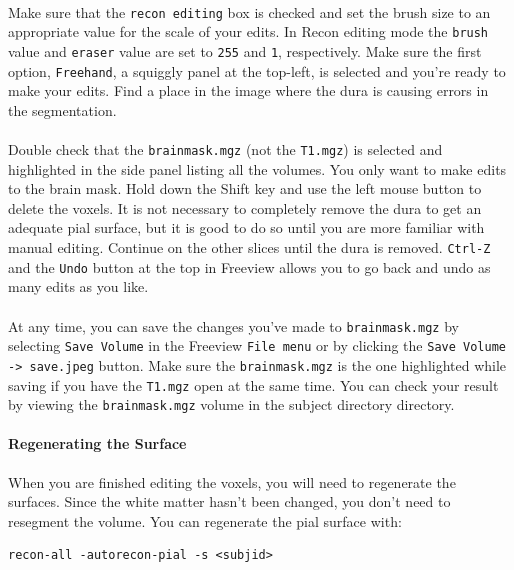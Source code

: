 \documentclass[paper=a4, fontsize=11pt]{scrartcl} %
\numberwithin{equation}{section} %
\numberwithin{figure}{section} %
\numberwithin{table}{section} %
\begin{document}
\paragraph{} Make sure that the \texttt{recon editing} box is checked and set the brush size to an appropriate value for the scale of your edits.  In Recon editing mode the \texttt{brush} value and \texttt{eraser} value are set to \texttt{255} and \texttt{1}, respectively. Make sure the first option, \texttt{Freehand}, a squiggly panel at the top-left, is selected and you're ready to make your edits. Find a place in the image where the dura is causing errors in the segmentation. 
\paragraph{}Double check that the \texttt{brainmask.mgz} (not the \texttt{T1.mgz}) is selected and highlighted in the side panel listing all the volumes. You only want to make edits to the brain mask. Hold down the Shift key and use the left mouse button to delete the voxels. It is not necessary to completely remove the dura to get an adequate pial surface, but it is good to do so until you are more familiar with manual editing. Continue on the other slices until the dura is removed. \texttt{Ctrl-Z} and the \texttt{Undo} button at the top in Freeview allows you to go back and undo as many edits as you like.  
\paragraph{}At any time, you can save the changes you've made to \texttt{brainmask.mgz}  by selecting \texttt{Save Volume} in the Freeview \texttt{File menu} or by clicking the \texttt{Save Volume  -> save.jpeg} button. Make sure the \texttt{brainmask.mgz} is the one highlighted while saving if you have the \texttt{T1.mgz} open at the same time. You can check your result by viewing the \texttt{brainmask.mgz} volume in the subject directory directory.
\paragraph{Regenerating the Surface} When you are finished editing the voxels, you will need to regenerate the surfaces. Since the white matter hasn't been changed, you don't need to resegment the volume. You can regenerate the pial surface with:
~\\
\begin{lstlisting}[frame=single]
recon-all -autorecon-pial -s <subjid>
\end{lstlisting}
\end{document}
